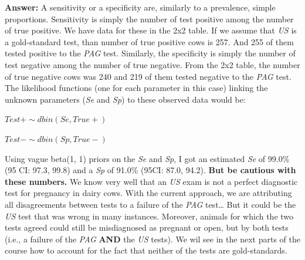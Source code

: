 \documentclass[
]{book}
\begin{document}
\textbf{Answer:} A sensitivity or a specificity are, similarly to a
prevalence, simple proportions. Sensitivity is simply the number of test
positive among the number of true positive. We have data for these in
the 2x2 table. If we assume that \emph{US} is a gold-standard test, than
number of true positive cows is 257. And 255 of them tested positive to
the \emph{PAG} test. Similarly, the specificity is simply the number of
test negative among the number of true negative. From the 2x2 table, the
number of true negative cows was 240 and 219 of them tested negative to
the \emph{PAG} test. The likelihood functions (one for each parameter in
this case) linking the unknown parameters (\emph{Se} and \emph{Sp}) to
these observed data would be:

\(Test+ \sim dbin(Se, True+)\)

\(Test- \sim dbin(Sp, True-)\)

Using vague beta(1, 1) priors on the \emph{Se} and \emph{Sp}, I got an
estimated \emph{Se} of 99.0\% (95 CI: 97.3, 99.8) and a \emph{Sp} of
91.0\% (95CI: 87.0, 94.2). \textbf{But be cautious with these numbers.}
We know very well that an \emph{US} exam is not a perfect diagnostic
test for pregnancy in dairy cows. With the current approach, we are
attributing all disagreements between tests to a failure of the
\emph{PAG} test\ldots{} But it could be the \emph{US} test that was
wrong in many instances. Moreover, animals for which the two tests
agreed could still be misdiagnosed as pregnant or open, but by both
tests (i.e., a failure of the \emph{PAG} \textbf{AND} the \emph{US}
tests). We wil see in the next parts of the course how to account for
the fact that neither of the tests are gold-standards.

\backmatter
\end{document}
